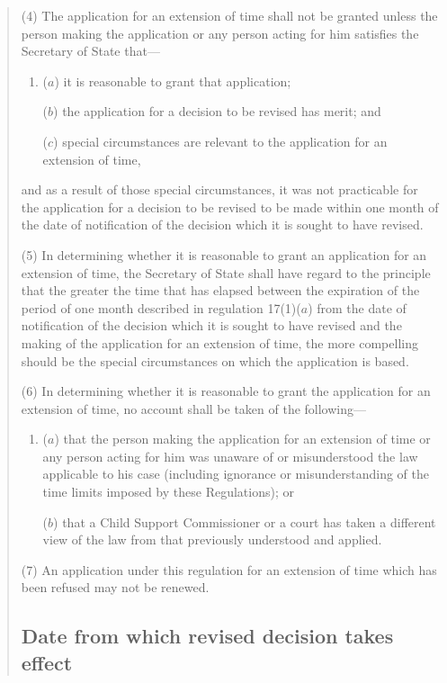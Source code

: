\documentclass[12pt,a4paper]{article}
\begin{document}
\begin{quotation}
(4) The application for an extension of time shall not be granted unless the person making the application or any person acting for him satisfies the Secretary of State that---
\begin{enumerate}\item[]
($a$) it is reasonable to grant that application;

($b$) the application for a decision to be revised has merit; and

($c$) special circumstances are relevant to the application for an extension of time,
\end{enumerate}
and as a result of those special circumstances, it was not practicable for the application for a decision to be revised to be made within one month of the date of notification of the decision which it is sought to have revised.

(5) In determining whether it is reasonable to grant an application for an extension of time, the Secretary of State shall have regard to the principle that the greater the time that has elapsed between the expiration of the period of one month described in regulation 17(1)($a$) from the date of notification of the decision which it is sought to have revised and the making of the application for an extension of time, the more compelling should be the special circumstances on which the application is based.

(6) In determining whether it is reasonable to grant the application for an extension of time, no account shall be taken of the following---
\begin{enumerate}\item[]
($a$) that the person making the application for an extension of time or any person acting for him was unaware of or misunderstood the law applicable to his case (including ignorance or misunderstanding of the time limits imposed by these Regulations); or

($b$) that a Child Support Commissioner or a court has taken a different view of the law from that previously understood and applied.
\end{enumerate}

(7) An application under this regulation for an extension of time which has been refused may not be renewed.

\subsection*{Date from which revised decision takes effect}


\end{quotation}
\end{document}
